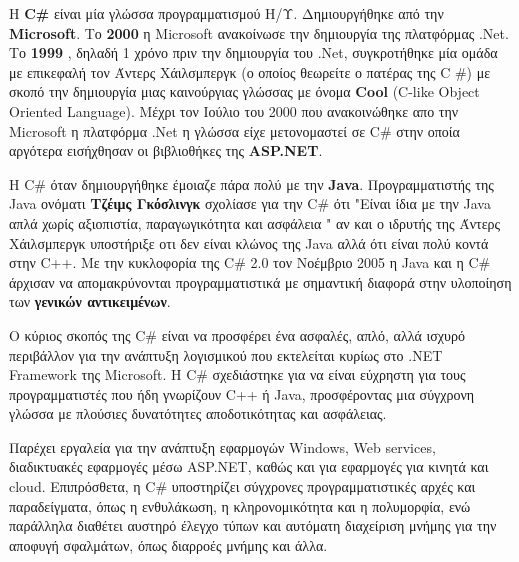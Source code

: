 Η \textbf{C\#} είναι μία γλώσσα προγραμματισμού Η/Υ. Δημιουργήθηκε από την \textbf{Microsoft}. Το \textbf{2000} η Microsoft ανακοίνωσε την δημιουργία της πλατφόρμας .Net. Το\textbf{ 1999} , δηλαδή 1 χρόνο πριν την δημιουργία του .Net, συγκροτήθηκε μία ομάδα με επικεφαλή τον Άντερς Χάιλσμπεργκ (ο οποίος θεωρείτε ο πατέρας της C \#) με σκοπό την δημιουργία μιας καινούργιας γλώσσας με όνομα \textbf{Cool} (C-like Object Oriented Language). Μέχρι τον Ιούλιο του 2000 που ανακοινώθηκε απο την Microsoft η πλατφόρμα .Net η γλώσσα είχε μετονομαστεί σε C\# στην οποία αργότερα εισήχθησαν οι βιβλιοθήκες της \textbf{ASP.NET}.

Η C\# όταν δημιουργήθηκε έμοιαζε πάρα πολύ με την \textbf{Java}. Προγραμματιστής της Java ονόματι \textbf{Τζέιμς Γκόσλινγκ} σχολίασε για την C\# ότι "Eίναι ίδια με την Java απλά χωρίς αξιοπιστία, παραγωγικότητα και ασφάλεια " αν και ο ιδρυτής της Άντερς Χάιλσμπεργκ υποστήριξε οτι δεν είναι κλώνος της Java αλλά ότι είναι πολύ κοντά στην C++. Με την κυκλοφορία της C\# 2.0 τον Νοέμβριο 2005 η Java και η C\# άρχισαν να απομακρύνονται προγραμματιστικά με σημαντική διαφορά στην υλοποίηση των \textbf{γενικών αντικειμένων}.

Ο κύριος σκοπός της C\# είναι να προσφέρει ένα ασφαλές, απλό, αλλά ισχυρό περιβάλλον για την ανάπτυξη λογισμικού που εκτελείται κυρίως στο .NET Framework της Microsoft. Η C\# σχεδιάστηκε για να είναι εύχρηστη για τους προγραμματιστές που ήδη γνωρίζουν C++ ή Java, προσφέροντας μια σύγχρονη γλώσσα με πλούσιες δυνατότητες αποδοτικότητας και ασφάλειας.

Παρέχει εργαλεία για την ανάπτυξη εφαρμογών Windows, Web services, διαδικτυακές εφαρμογές μέσω ASP.NET, καθώς και για εφαρμογές για κινητά και cloud. Επιπρόσθετα, η C\# υποστηρίζει σύγχρονες προγραμματιστικές αρχές και παραδείγματα, όπως η ενθυλάκωση, η κληρονομικότητα και η πολυμορφία, ενώ παράλληλα διαθέτει αυστηρό έλεγχο τύπων και αυτόματη διαχείριση μνήμης για την αποφυγή σφαλμάτων, όπως διαρροές μνήμης και άλλα.

